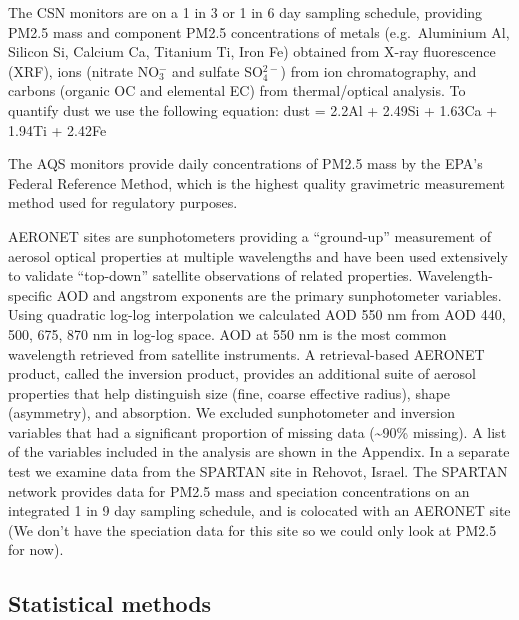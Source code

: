 \documentclass[, manuscript]{copernicus}
\begin{document}
The CSN monitors are on a 1 in 3 or 1 in 6 day sampling schedule,
providing PM2.5 mass and component PM2.5 concentrations of metals
(e.g.~Aluminium Al, Silicon Si, Calcium Ca, Titanium Ti, Iron Fe)
obtained from X-ray fluorescence (XRF), ions (nitrate NO\(_{3}^-\) and
sulfate SO\(_4^{2-}\)) from ion chromatography, and carbons (organic OC
and elemental EC) from thermal/optical analysis. To quantify dust we use
the following equation: dust = 2.2Al + 2.49Si + 1.63Ca + 1.94Ti + 2.42Fe

The AQS monitors provide daily concentrations of PM2.5 mass by the EPA's
Federal Reference Method, which is the highest quality gravimetric
measurement method used for regulatory purposes.

AERONET sites are sunphotometers providing a ``ground-up'' measurement
of aerosol optical properties at multiple wavelengths and have been used
extensively to validate ``top-down'' satellite observations of related
properties. Wavelength-specific AOD and angstrom exponents are the
primary sunphotometer variables. Using quadratic log-log interpolation
we calculated AOD 550 nm from AOD 440, 500, 675, 870 nm in log-log
space. AOD at 550 nm is the most common wavelength retrieved from
satellite instruments. A retrieval-based AERONET product, called the
inversion product, provides an additional suite of aerosol properties
that help distinguish size (fine, coarse effective radius), shape
(asymmetry), and absorption. We excluded sunphotometer and inversion
variables that had a significant proportion of missing data
(\textasciitilde{}90\% missing). A list of the variables included in the
analysis are shown in the Appendix. In a separate test we examine data
from the SPARTAN site in Rehovot, Israel. The SPARTAN network provides
data for PM2.5 mass and speciation concentrations on an integrated 1 in
9 day sampling schedule, and is colocated with an AERONET site (We don't
have the speciation data for this site so we could only look at PM2.5
for now).

\subsection{Statistical methods}
\end{document}
